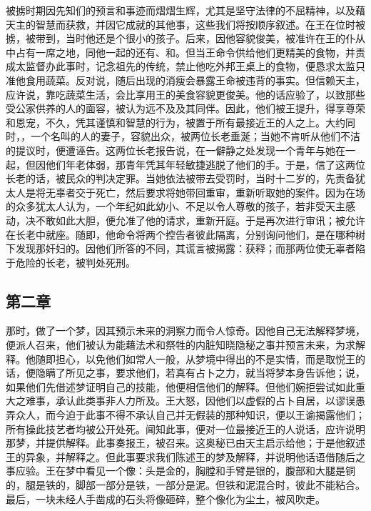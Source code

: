 被掳时期因先知们的预言和事迹而熠熠生辉，尤其是坚守法律的不屈精神，以及藉天主的智慧而获救，并因它成就的其他事，这些我们将按顺序叙述。在王在位时被掳，被带到，当时他还是个很小的孩子。后来，因他容貌俊美，被准许在王的仆从中占有一席之地，同他一起的还有、和。但当王命令供给他们更精美的食物，并责成太监督办此事时，记念祖先的传统，禁止他吃外邦王桌上的食物，便恳求太监只准他食用蔬菜。反对说，随后出现的消瘦会暴露王命被违背的事实。但信赖天主，应许说，靠吃蔬菜生活，会比享用王的美食容貌更俊美。他的话应验了，以致那些受公家供养的人的面容，被认为远不及及其同伴。因此，他们被王提升，得享尊荣和恩宠，不久，凭其谨慎和智慧的行为，被置于所有最接近王的人之上。大约同时，，一个名叫的人的妻子，容貌出众，被两位长老垂涎；当她不肯听从他们不洁的提议时，便遭诬告。这两位长老报告说，在一僻静之处发现一个青年与她在一起，但因他们年老体弱，那青年凭其年轻敏捷逃脱了他们的手。于是，信了这两位长老的话，被民众的判决定罪。当她依法被带去受罚时，当时十二岁的，先责备犹太人是将无辜者交于死亡，然后要求将她带回重审，重新听取她的案件。因为在场的众多犹太人认为，一个年纪如此幼小、不足以令人尊敬的孩子，若非受天主感动，决不敢如此大胆，便允准了他的请求，重新开庭。于是再次进行审讯；被允许在长老中就座。随即，他命令将两个控告者彼此隔离，分别询问他们，是在哪种树下发现那奸妇的。因他们所答的不同，其谎言被揭露：获释；而那两位使无辜者陷于危险的长老，被判处死刑。\par


\subsection{第二章}

那时，做了一个梦，因其预示未来的洞察力而令人惊奇。因他自己无法解释梦境，便派人召来，他们被认为能藉法术和祭牲的内脏知晓隐秘之事并预言未来，为求解释。他随即担心，以免他们如常人一般，从梦境中得出的不是实情，而是取悦王的话，便隐瞒了所见之事，要求他们，若真有占卜之力，就当将梦本身告诉他；说，如果他们先借述梦证明自己的技能，他便相信他们的解释。但他们婉拒尝试如此重大之难事，承认此类事非人力所及。王大怒，因他们以虚假的占卜自居，以谬误愚弄众人，而今迫于此事不得不承认自己并无假装的那种知识，便以王谕揭露他们；所有操此技艺者均被公开处死。闻知此事，便对一位最接近王的人说话，应许说明那梦，并提供解释。此事奏报王，被召来。这奥秘已由天主启示给他；于是他叙述王的异象，并解释之。但此事要求我们陈述王的梦及解释，并说明他话语借随后之事应验。王在梦中看见一个像：头是金的，胸膛和手臂是银的，腹部和大腿是铜的，腿是铁的，脚部一部分是铁，一部分是泥。但铁和泥混合时，彼此不能粘合。最后，一块未经人手凿成的石头将像砸碎，整个像化为尘土，被风吹走。\par

